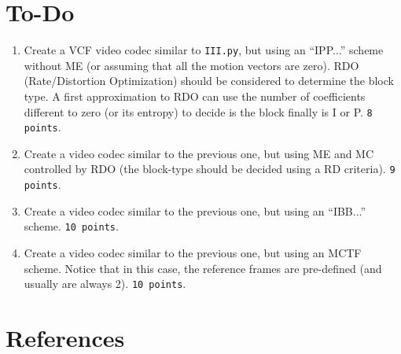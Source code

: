 \section{To-Do}

\begin{enumerate}
\item Create a VCF video codec similar to \texttt{III.py}, but using
  an ``IPP...''  scheme without ME (or assuming that all the motion
  vectors are zero). RDO (Rate/Distortion Optimization) should be
  considered to determine the block type. A first approximation to RDO
  can use the number of coefficients different to zero (or its
  entropy) to decide is the block finally is I or P. \texttt{8
    points}.
\item Create a video codec similar to the previous one, but using ME
  and MC controlled by RDO (the block-type should be decided using a
  RD criteria). \texttt{9 points}.
\item Create a video codec similar to the previous one, but using an
  ``IBB...'' scheme. \texttt{10 points}.
\item Create a video codec similar to the previous one, but using an
  MCTF scheme. Notice that in this case, the reference frames are
  pre-defined (and usually are always 2). \texttt{10 points}.
\end{enumerate}

  
\section{References}

\renewcommand{\addcontentsline}[3]{}%


